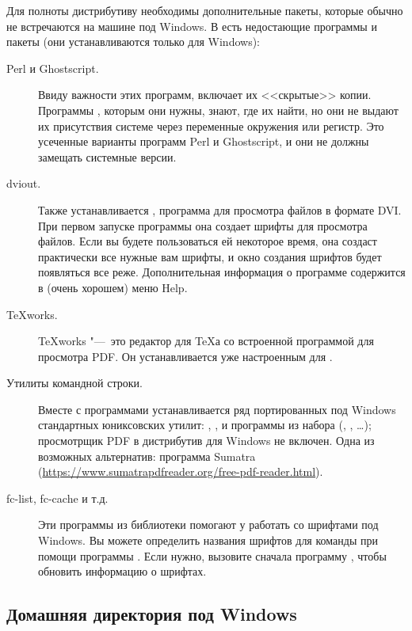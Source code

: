 \documentclass{article}
\begin{document}
Для полноты дистрибутиву \TL необходимы дополнительные пакеты,
которые обычно не встречаются на машине под  Windows.  В \TL{} есть
недостающие программы и пакеты (они устанавливаются только для Windows):
\begin{description}
\item[Perl и Ghostscript.] Ввиду важности этих программ, \TL{}
  включает их <<скрытые>> копии.  Программы \TL{}, которым они нужны,
  знают, где их найти, но они не выдают их присутствия системе через
  переменные окружения или регистр.  Это усеченные варианты программ
  Perl и Ghostscript, и они не должны замещать системные версии.


\item[dviout.] Также устанавливается , программа для
  просмотра файлов в формате DVI.  При первом запуске программы
  она создает шрифты для просмотра файлов.  Если вы будете
  пользоваться ей некоторое время, она создаст практически все нужные
  вам шрифты, и окно создания шрифтов будет появляться все реже.
  Дополнительная информация о программе содержится в (очень хорошем)
  меню Help.


\item[TeXworks.]  \TeX{}works "---~это редактор для \TeX а со
  встроенной программой для просмотра PDF.  Он устанавливается
  уже настроенным для \TL.



\item[Утилиты командной строки.] Вместе с программами \TL{}
  устанавливается ряд портированных под Windows стандартных
  юниксовских утилит: , ,  и
  программы из набора  (,
  , \ldots);  просмотрщик PDF в дистрибутив для
  Windows не включен.  Одна из возможных альтернатив: программа 
  Sumatra
  (\url{https://www.sumatrapdfreader.org/free-pdf-reader.html}).

\item[fc-list, fc-cache и т.д.] Эти программы из библиотеки
   помогают \XeTeX у работать со шрифтами под
  Windows.  Вы можете определить названия шрифтов для команды
   при помощи программы .  Если нужно, вызовите
  сначала программу , чтобы обновить информацию о
  шрифтах. 

\end{description}


\subsection{Домашняя директория под Windows}
\label{sec:winhome}
\end{document}
